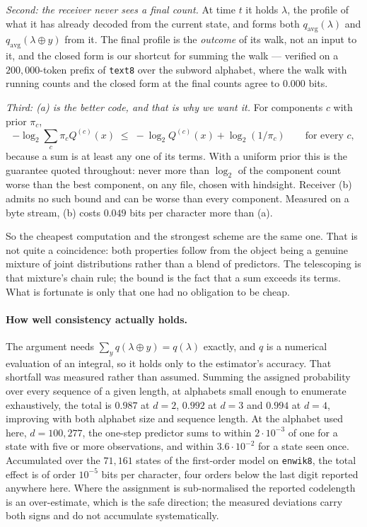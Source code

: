 \documentclass[11pt]{article}
\begin{document}
\emph{Second: the receiver never sees a final count.}  At time $t$ it
holds $\lambda$, the profile of what it has already decoded from the
current state, and forms both $q_{\mathrm{avg}}(\lambda)$ and
$q_{\mathrm{avg}}(\lambda \oplus y)$ from it.  The final profile is the
\emph{outcome} of its walk, not an input to it, and the closed form is
our shortcut for summing the walk --- verified on a $200{,}000$-token
prefix of \texttt{text8} over the subword alphabet, where the walk with
running counts and the closed form at the final counts agree to
$0.000$ bits.

\emph{Third: (a) is the better code, and that is why we want it.}  For
components $c$ with prior $\pi_c$,
\[
  -\log_2 \sum_{c} \pi_c Q^{(c)}(x)
  \;\le\; -\log_2 Q^{(c)}(x) + \log_2 (1/\pi_c)
  \qquad\text{for every } c,
\]
because a sum is at least any one of its terms.  With a uniform prior
this is the guarantee quoted throughout: never more than $\log_2$ of
the component count worse than the best component, on any file, chosen
with hindsight.  Receiver (b) admits no such bound and can be worse
than every component.  Measured on a byte stream, (b) costs
$0.049$ bits per character more than (a).

So the cheapest computation and the strongest scheme are the same one.
That is not quite a coincidence: both properties follow from the object
being a genuine mixture of joint distributions rather than a blend of
predictors.  The telescoping is that mixture's chain rule; the bound is
the fact that a sum exceeds its terms.  What is fortunate is only that
one had no obligation to be cheap.

\paragraph{How well consistency actually holds.}  The argument needs
$\sum_y q(\lambda \oplus y) = q(\lambda)$ exactly, and $q$ is a
numerical evaluation of an integral, so it holds only to the estimator's
accuracy.  That shortfall was measured rather than assumed.  Summing the
assigned probability over every sequence of a given length, at alphabets
small enough to enumerate exhaustively, the total is $0.987$ at $d=2$,
$0.992$ at $d=3$ and $0.994$ at $d=4$, improving with both alphabet size
and sequence length.  At the alphabet used here, $d = 100{,}277$, the
one-step predictor sums to within $2 \cdot 10^{-3}$ of one for a state
with five or more observations, and within $3.6 \cdot 10^{-2}$ for a
state seen once.  Accumulated over the $71{,}161$ states of the
first-order model on \texttt{enwik8}, the total effect is of order
$10^{-5}$ bits per character, four orders below the last digit reported
anywhere here.  Where the assignment is sub-normalised the reported
codelength is an over-estimate, which is the safe direction; the
measured deviations carry both signs and do not accumulate
systematically.
\end{document}

